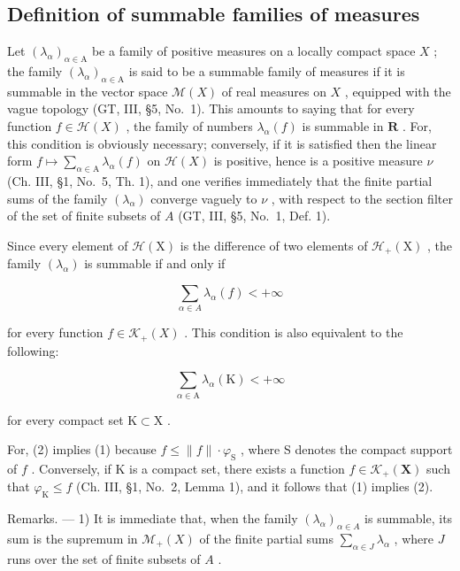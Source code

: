 \subsection{Definition of summable families of measures}

Let \((\lambda_{\alpha})_{\alpha \in \mathrm{A}}\) be a family of positive measures on a locally compact space \(X\) ; the family \((\lambda_{\alpha})_{\alpha \in \mathrm{A}}\) is said to be a summable family of measures if it is summable in the vector space \(\mathcal{M}(X)\) of real measures on \(X\) , equipped with the vague topology (GT, III, §5, No.~1). This amounts to saying that for every function \(f \in \mathcal{H}(X)\) , the family of numbers \(\lambda_{\alpha}(f)\) is summable in \(\mathbf{R}\) . For, this condition is obviously necessary; conversely, if it is satisfied then the linear form \(f \mapsto \sum_{\alpha \in \mathrm{A}} \lambda_{\alpha}(f)\) on \(\mathcal{H}(X)\) is positive, hence is a positive measure \(\nu\) (Ch. III, §1, No.~5, Th. 1), and one verifies immediately that the finite partial sums of the family \((\lambda_{\alpha})\) converge vaguely to \(\nu\) , with respect to the section filter of the set of finite subsets of \(A\) (GT, III, §5, No.~1, Def. 1).

Since every element of \(\mathcal{H}(\mathrm{X})\) is the difference of two elements of \(\mathcal{H}_{+}(\mathrm{X})\) , the family \((\lambda_{\alpha})\) is summable if and only if

\[
\sum_ {\alpha \in A} \lambda_ {\alpha} (f) <   + \infty\tag{1}
\]

for every function \(f \in \mathcal{K}_{+}(X)\) . This condition is also equivalent to the following:

\[
\sum_ {\alpha \in \mathrm{A}} \lambda_ {\alpha} (\mathrm{K}) <   + \infty\tag{2}
\]

for every compact set \(\mathrm{K} \subset \mathrm{X}\) .

For, (2) implies (1) because \(f \leqslant \|f\| \cdot \varphi_{\mathrm{S}}\) , where S denotes the compact support of \(f\) . Conversely, if K is a compact set, there exists a function \(f \in \mathcal{K}_{+}(\mathbf{X})\) such that \(\varphi_{\mathrm{K}} \leqslant f\) (Ch. III, §1, No.~2, Lemma 1), and it follows that (1) implies (2).

Remarks. --- 1) It is immediate that, when the family \((\lambda_{\alpha})_{\alpha \in A}\) is summable, its sum is the supremum in \(\mathcal{M}_{+}(X)\) of the finite partial sums \(\sum_{\alpha \in J} \lambda_{\alpha}\) , where \(J\) runs over the set of finite subsets of \(A\) .

